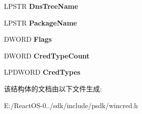 \begin{DoxyCompactItemize}
L\+P\+S\+TR {\bfseries Dns\+Tree\+Name}
\item 
\mbox{\label{struct___c_r_e_d_e_n_t_i_a_l___t_a_r_g_e_t___i_n_f_o_r_m_a_t_i_o_n_a_aeab4c74de93be33095722c05c8d5b72f}} 
L\+P\+S\+TR {\bfseries Package\+Name}
\item 
\mbox{\label{struct___c_r_e_d_e_n_t_i_a_l___t_a_r_g_e_t___i_n_f_o_r_m_a_t_i_o_n_a_a738cbff5681db357e022db33074f4933}} 
D\+W\+O\+RD {\bfseries Flags}
\item 
\mbox{\label{struct___c_r_e_d_e_n_t_i_a_l___t_a_r_g_e_t___i_n_f_o_r_m_a_t_i_o_n_a_a36b8d884f4885c06635f5029a383a95f}} 
D\+W\+O\+RD {\bfseries Cred\+Type\+Count}
\item 
\mbox{\label{struct___c_r_e_d_e_n_t_i_a_l___t_a_r_g_e_t___i_n_f_o_r_m_a_t_i_o_n_a_a2061cb03d2f998888d0c8366bb583412}} 
L\+P\+D\+W\+O\+RD {\bfseries Cred\+Types}
\end{DoxyCompactItemize}


该结构体的文档由以下文件生成\+:\begin{DoxyCompactItemize}
\item 
E\+:/\+React\+O\+S-\/0../sdk/include/psdk/wincred.\+h\end{DoxyCompactItemize}

